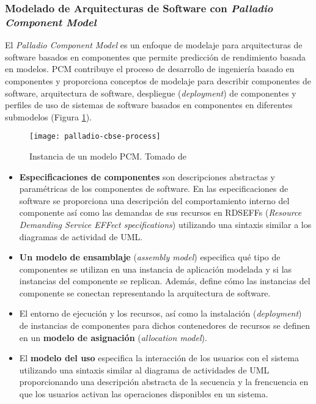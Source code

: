 \subsubsection{Modelado de Arquitecturas de Software con \emph{Palladio Component Model}}
El \emph{Palladio Component Model} es un enfoque de modelaje para arquitecturas de software basados en componentes que permite predicción de rendimiento basada en modelos. PCM contribuye el proceso de desarrollo de ingeniería basado en componentes y proporciona conceptos de modelaje para describir componentes de software, arquitectura de software, despliegue (\emph{deployment}) de componentes y perfiles de uso de sistemas de software basados en componentes en diferentes submodelos (Figura \ref{fig:pcm-instance}). 

\begin{figure}[h]
  \centering
  \texttt{[image: palladio-cbse-process]}
  \caption[Instancia de un modelo PCM]{Instancia de un modelo PCM. Tomado de \protect\cite{Becker:2009:PCM:1458724.1458819}}
  \label{fig:pcm-instance}
\end{figure}

\begin{itemize}
    \item \textbf{Especificaciones de componentes} son descripciones abstractas y paramétricas de los componentes de software. En las especificaciones de software se proporciona una descripción del comportamiento interno del componente así como las demandas de sus recursos en RDSEFFs (\emph{Resource Demanding Service EFFect specifications}) utilizando una sintaxis similar a los diagramas de actividad de UML.
    \item \textbf{Un modelo de ensamblaje} (\emph{assembly model}) especifica qué tipo de componentes se utilizan en una instancia de aplicación modelada y si las instancias del componente se replican. Además, define cómo las instancias del componente se conectan representando la arquitectura de software.
    \item El entorno de ejecución y los recursos, así como la instalación (\emph{deployment}) de instancias de componentes para dichos contenedores de recursos se definen en un \textbf{modelo de asignación} (\emph{allocation model}).
    \item El \textbf{modelo del uso} especifica la interacción de los usuarios con el sistema utilizando una sintaxis similar al diagrama de actividades de UML proporcionando una descripción abstracta de la secuencia y la frencuencia en que los usuarios activan las operaciones disponibles en un sistema.
\end{itemize}

